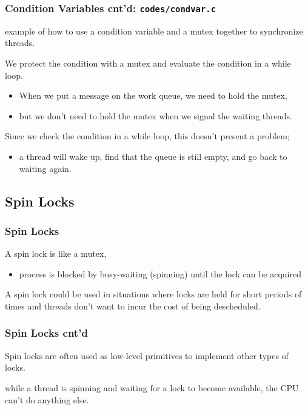 \documentclass[newPxFont,sthlmFooter,nooffset]{beamer}
\begin{document}
\begin{frame}
  \frametitle{Condition Variables cnt'd: \texttt{codes/condvar.c}}
example of how to use a condition variable and a mutex together to synchronize threads.
  

We protect the condition with a mutex and evaluate the condition in a while loop. 
\begin{itemize}
\item When we put a message on the work queue, we need to hold the
  mutex,
\item but we don’t need to hold the mutex when we signal the
  waiting threads.
\end{itemize}

Since we check the condition in a while loop, this doesn’t present a problem;
\begin{itemize}
\item a thread will wake up, find that the queue is still empty, and
  go back to waiting again.
\end{itemize}

\end{frame}

\subsection{Spin Locks}

\begin{frame}[t]
  \frametitle{Spin Locks}
A spin lock is like a mutex,
\begin{itemize}
\item process is blocked by busy-waiting (spinning) until the lock can be acquired
\end{itemize}
A spin lock could be used in situations where locks are held for short periods of times and threads don’t want to incur the cost of being descheduled.

\end{frame}

\begin{frame}[t]
  \frametitle{Spin Locks cnt'd}
Spin locks are often used as low-level primitives to implement other types of locks. 

while a thread is spinning and waiting for a lock to become available, the CPU can’t do anything else.
\end{frame}
\end{document}
